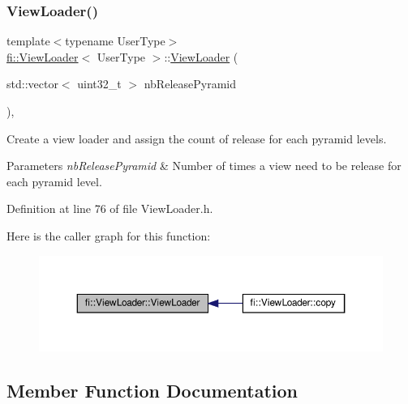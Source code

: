 \subsubsection{\texorpdfstring{View\+Loader()}{ViewLoader()}}
{\footnotesize\ttfamily template$<$typename User\+Type$>$ \\
\hyperlink{classfi_1_1ViewLoader}{fi\+::\+View\+Loader}$<$ User\+Type $>$\+::\hyperlink{classfi_1_1ViewLoader}{View\+Loader} (\begin{DoxyParamCaption}\item[{std\+::vector$<$ uint32\+\_\+t $>$}]{nb\+Release\+Pyramid }\end{DoxyParamCaption})\hspace{0.3cm}{\ttfamily [inline]}, {\ttfamily [explicit]}}



Create a view loader and assign the count of release for each pyramid levels. 


\begin{DoxyParams}{Parameters}
{\em nb\+Release\+Pyramid} & Number of times a view need to be release for each pyramid level. \\
\hline
\end{DoxyParams}


Definition at line 76 of file View\+Loader.\+h.

Here is the caller graph for this function\+:
\nopagebreak
\begin{figure}[H]
\begin{center}
\leavevmode
\includegraphics[width=350pt]{d8/daf/classfi_1_1ViewLoader_ab026a286c497c820c495242122658af9_icgraph}
\end{center}
\end{figure}


\subsection{Member Function Documentation}
\mbox{\label{classfi_1_1ViewLoader_aa7d11a576a793de8b4c870c40534b75d}} 
